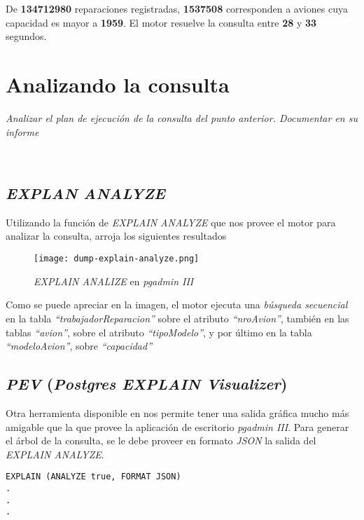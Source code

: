 De \textbf{134712980} reparaciones registradas, \textbf{1537508} corresponden a aviones cuya capacidad es mayor a \textbf{1959}. El motor resuelve la consulta entre \textbf{28} y \textbf{33} segundos.

\section{Analizando la consulta}
\emph{Analizar el plan de ejecución de la consulta del punto anterior. Documentar en su informe} 

~\\



\subsection{\emph{EXPLAN ANALYZE}}

Utilizando la función de \emph{EXPLAIN ANALYZE} que nos provee el motor para analizar la consulta, arroja los siguientes resultados 

\begin{figure}[H]
    \texttt{[image: dump-explain-analyze.png]}
    \caption{\emph{EXPLAIN ANALIZE} en \emph{pgadmin III} }
\end{figure}
 
Como se puede apreciar en la imagen, el motor ejecuta una \emph{búsqueda secuencial} en la tabla \emph{``trabajadorReparacion''} sobre el atributo \emph{``nroAvion''}, también en las tablas \emph{``avion''}, sobre el atributo \emph{``tipoModelo''}, y por último en la tabla \emph{``modeloAvion''}, sobre \emph{``capacidad''}     


\subsection{\emph{PEV} (\emph{Postgres EXPLAIN Visualizer})}

Otra herramienta disponible en \cite{pev} nos permite tener una salida gráfica mucho más amigable que la que provee la aplicación de escritorio \emph{pgadmin III}. Para generar el árbol de la consulta, se le debe proveer en formato \emph{JSON} la salida del \emph{EXPLAIN ANALYZE}. 

\vspace*{5mm}
\begin{lstlisting}
EXPLAIN (ANALYZE true, FORMAT JSON)
.
.
.
\end{lstlisting}

